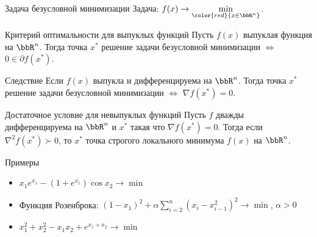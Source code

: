 \documentclass[12pt]{beamer}
\begin{document}
\begin{frame}{Задача безусловной минимизации}
Задача: $f(x) \rightarrow \min\limits_{\color{red}{x \in \bbR^n}}$.

\begin{block}{Критерий оптимальности для выпуклых функций}
Пусть $f(x)$ выпуклая функция на $\bbR^n$. 
Тогда точка $x^*$ решение задачи безусловной минимизации $\Leftrightarrow$ $0 \in \partial f(x^*)$.
\end{block}

\begin{block}{Следствие}
Если $f(x)$ выпукла и дифференцируема на $\bbR^n$.
Тогда точка $x^*$ решение задачи безусловной минимизации $\Leftrightarrow$ $\nabla f(x^*) = 0$.
\end{block}

\begin{block}{Достаточное условие для невыпуклых функций}
Пусть $f$ дважды дифференцируема на $\bbR^n$ и $x^*$ такая что $\nabla f(x^*) = 0$. 
Тогда если $\nabla^2 f(x^*) \succ 0$, то $x^*$ точка строгого локального минимума $f(x)$ на $\bbR^n$.  
\end{block}

\end{frame}

\begin{frame}{Примеры}
\begin{itemize}
\item $x_1e^{x_1} - (1 + e^{x_1})\cos x_2 \rightarrow \min$
\item Функция Розенброка: $(1 - x_1)^2 + \alpha \sum\limits_{i = 2}^n (x_i - x^2_{i-1})^2 \rightarrow \min$, $\alpha > 0$
\item $x^2_1 + x^2_2 - x_1x_2 + e^{x_1 + x_2} \rightarrow \min$
\end{itemize}
\end{frame}
\end{document}
